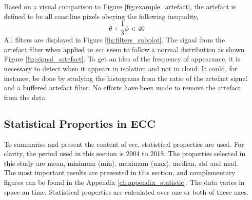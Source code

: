 Based on a visual comparison to Figure \ref{fig:example_artefact}, the artefact is defined to be all coastline pixels obeying the following inequality,  %
\begin{equation} \label{eq:artefact_condition}
    \theta + \frac{1}{3}\phi < 40
\end{equation}
All filters are displayed in Figure \ref{fig:filters_subplot}. 
The signal from the artefact filter when applied to \acrshort{ecc} seem to follow a normal distribution as shown Figure \ref{fig:signal_artefact}. To get an idea of the frequency of appearance, it is necessary to detect when it appears in isolation and not in cloud. It could, for instance, be done by studying the histograms from the ratio of the artefact signal and a buffered artefact filter.
No efforts have been made to remove the artefact from the data. %

\subsection{Statistical Properties in ECC}
To summarise and present the content of \acrshort{ecc}, statistical properties are used. For clarity, the period used in this section is 2004 to 2018. The properties selected in this study are mean, minimum (min), maximum (max), median, \acrfull{std} and \acrfull{mad}. The most important results are presented in this section, and complementary figures can be found in the Appendix \ref{ch:appendix_statistic}. 
The data varies in space an time. Statistical properties are calculated over one or both of these axes.

